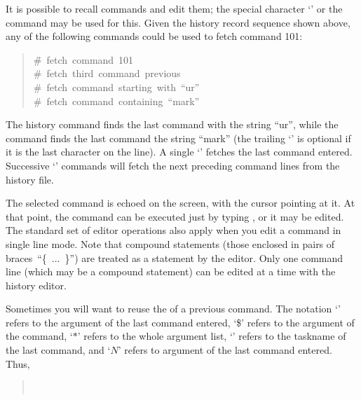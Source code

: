 It is possible to recall  commands and edit them;
the special character `\upa' or the  command may be
used for this.  Given the history record sequence shown above,
any of the following commands could be used to fetch command 101:

\begin{quotation}\noindent
\begin{tabbing}
  \hspace{2cm} \= \#~fetch~command~101 \\
\medskip
{}   \> \#~fetch~third~command~previous \\
\medskip
{}   \> \#~fetch~command~starting~with~``ur'' \\
\medskip
{}  \> \#~fetch~command~containing~``mark''
\end{tabbing}
\end{quotation}

The history command  finds the last command
 with the string ``ur'', while the command
 finds the last command  the
string ``mark'' (the trailing `' is optional if it is the
last character on the line). A single `\upa' fetches the last command
entered.  Successive `\upa' commands 
will fetch the next preceding command lines from the history file.

The selected command is echoed on the screen, with the cursor pointing at it.
At that point, the command can be executed just by typing ,
or it may be edited. The standard set of editor operations also apply
when you edit a command in single line mode. Note that compound statements
(those enclosed in pairs of braces~``\{~$\ldots$~\}'') are treated as a
 statement by the editor.  Only one command line (which may
be a compound statement) can be edited at a time with the history editor.

Sometimes you will want to reuse the  of a previous
command.  The notation `\upa\upa' refers to the  argument
of the last command entered, `\upa\$' refers to the  argument
of the command, `\upa$*$' refers to the whole argument list, `' refers
to the taskname of the last command, and `\upa$N$' refers to argument
 of the last command entered.  Thus,

\begin{quotation}\noindent
{}  \\
 
\end{quotation}

